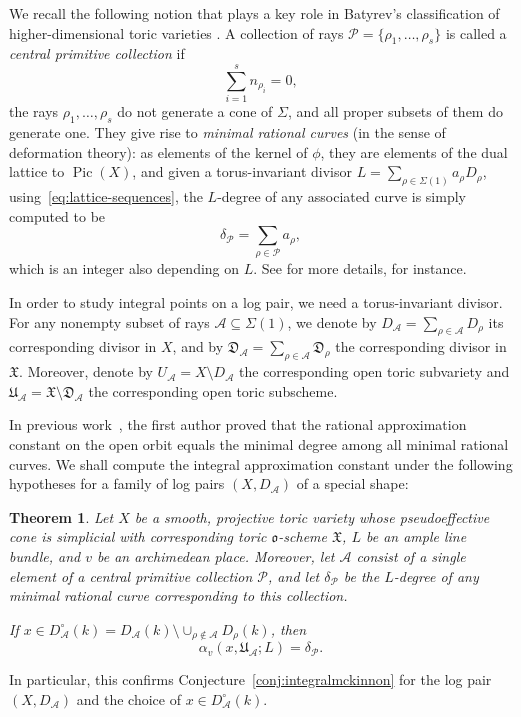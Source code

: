 \documentclass[a4paper, twoside, 11pt]{amsart}
\newtheorem{theorem}{Theorem}[section]
\theoremstyle{definition}
\newcommand{\cA}{\mathcal{A}}
\newcommand{\cP}{\mathcal{P}}
\newcommand{\mD}{\mathfrak{D}}
\newcommand{\mU}{\mathfrak{U}}
\newcommand{\mX}{\mathfrak{X}}
\newcommand{\fo}{\mathfrak{o}}
\DeclareMathOperator{\Pic}{Pic}
\begin{document}
	We recall the following notion that plays a key role in Batyrev's classification of higher-dimensional toric varieties \cite{Batyrev}.
	A collection of rays $\cP=\{\rho_1,\dots,\rho_s\}$ is called a \emph{central primitive collection} if
	\begin{equation*}
		\sum_{i=1}^{s} n_{\rho_i}=0,
	\end{equation*}
	the rays $\rho_1,\dots,\rho_s$ do not generate a cone of $\Sigma$, and all proper subsets of them do generate one. They give rise to \emph{minimal rational curves} (in the sense of deformation theory): as elements of the kernel of $\phi$, they are elements of the dual lattice to $\Pic(X)$, and given a torus-invariant divisor $L = \sum_{\rho\in \Sigma(1)} a_\rho D_\rho$, using~\eqref{eq:lattice-sequences}, the $L$-degree of any associated curve is simply computed to be
	\begin{equation*}
		\delta_{\cP} = \sum_{\rho\in \cP} a_\rho,
	\end{equation*}
	which is an integer also depending on $L$.
	See \cite[\S\,2B]{HuangANT} for more details, for instance. 
	
	In order to study integral points on a log pair, we need a torus-invariant divisor. For any nonempty subset of rays $\cA\subseteq \Sigma(1)$, we denote by  $D_{\cA}=\sum_{\rho\in\cA } D_\rho$ its corresponding divisor in $X$, and by $\mD_{\cA}=\sum_{\rho\in\cA } \mD_\rho$ the corresponding divisor in $\mX$. Moreover, denote by $U_{\cA}=X\setminus D_\cA$ the corresponding open toric subvariety and $\mU_{\cA}=\mX \setminus \mD_{\cA}$ the corresponding open toric subscheme. 
    
In previous work~\cite[Thm.~1.2]{HuangANT}, the first author proved that the rational approximation constant on the open orbit equals the minimal degree among all minimal rational curves. We shall compute the integral approximation constant under the following hypotheses for a family of log pairs $(X,D_\cA)$ of a special shape: 

\begin{theorem}\label{thm:toricgeneralrestrictive}
   	Let $X$ be a smooth, projective toric variety whose pseudoeffective cone is simplicial with corresponding toric $\fo$-scheme $\mX$, $L$ be an ample line bundle, and $v$ be an archimedean place.
	Moreover, let $\cA$ consist of a single element of a central primitive collection $\cP$, and  
    let $\delta_\cP$ be the $L$-degree of any minimal rational curve corresponding to this collection.
	
	If $x\in D_{\cA}^\circ(k)=D_{\cA}(k)\setminus \cup_{\rho\notin\cA}D_{\rho}(k)$, then
		\begin{equation*}
			\alpha_v(x,\mU_{\cA};L)=\delta_\cP.
		\end{equation*}
\end{theorem}
In particular, this confirms Conjecture~\ref{conj:integralmckinnon} for the log pair $(X,D_\cA)$ and the choice of $x\in D_{\cA}^\circ(k)$.
\end{document}
